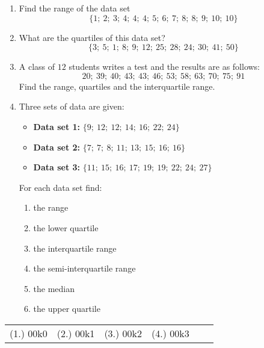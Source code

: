 \begin{exercises}{}{
  \begin{enumerate}[noitemsep, label=\textbf{\arabic*}.]

  \item Find the range of the data set
    \begin{equation*}
      \{1;\ 2;\ 3;\ 4;\ 4;\ 4;\ 5;\ 6;\ 7;\ 8;\ 8;\ 9;\ 10;\ 10\}
    \end{equation*}

  \item What are the quartiles of this data set?
    \begin{equation*}
      \{3;\ 5;\ 1;\ 8;\ 9;\ 12;\ 25;\ 28;\ 24;\ 30;\ 41;\ 50\}
    \end{equation*}

  \item A class of $12$ students writes a test and the results are as
    follows:
    \begin{equation*}
      20;\ 39;\ 40;\ 43;\ 43;\ 46;\ 53;\ 58;\ 63;\ 70;\ 75;\ 91
    \end{equation*}
    Find the range, quartiles and the interquartile range.

  \item Three sets of data are given:
    \begin{itemize}  
    \item \textbf{Data set 1:} $\{9;\ 12;\ 12;\ 14;\ 16;\ 22;\ 24\}$
    \item \textbf{Data set 2:} $\{7;\ 7;\ 8;\ 11;\ 13;\ 15;\ 16;\ 16\}$
    \item \textbf{Data set 3:} $\{11;\ 15;\ 16;\ 17;\ 19;\ 19;\ 22;\ 24;\ 27\}$
    \end{itemize}
    For each data set find:
    \begin{enumerate}[noitemsep, label=\textbf{(\alph*)} ]
    \item the range
    \item the lower quartile
    \item the interquartile range
    \item the semi-interquartile range
    \item the median
    \item the upper quartile
    \end{enumerate}
  \end{enumerate}
\practiceinfo
\par 
\par \begin{tabular}[h]{cccccc}
(1.) 00k0&  (2.) 00k1&  (3.) 00k2&  (4.) 00k3& \end{tabular}
}
\end{exercises}

